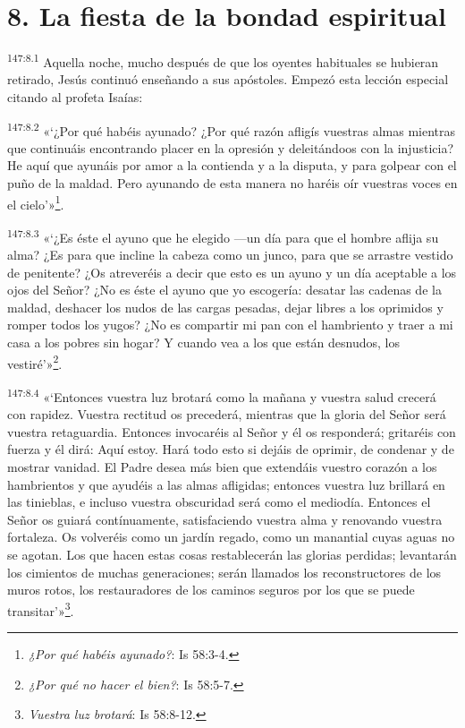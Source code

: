\section*{8. La fiesta de la bondad espiritual}
\par
\textsuperscript{147:8.1} Aquella noche, mucho después de que los oyentes habituales se hubieran retirado, Jesús continuó enseñando a sus apóstoles. Empezó esta lección especial citando al profeta Isaías:

\par
\textsuperscript{147:8.2} «`¿Por qué habéis ayunado? ¿Por qué razón afligís vuestras almas mientras que continuáis encontrando placer en la opresión y deleitándoos con la injusticia? He aquí que ayunáis por amor a la contienda y a la disputa, y para golpear con el puño de la maldad. Pero ayunando de esta manera no haréis oír vuestras voces en el cielo'»\footnote{\textit{¿Por qué habéis ayunado?}: Is 58:3-4.}.

\par
\textsuperscript{147:8.3} «`¿Es éste el ayuno que he elegido ---un día para que el hombre aflija su alma? ¿Es para que incline la cabeza como un junco, para que se arrastre vestido de penitente? ¿Os atreveréis a decir que esto es un ayuno y un día aceptable a los ojos del Señor? ¿No es éste el ayuno que yo escogería: desatar las cadenas de la maldad, deshacer los nudos de las cargas pesadas, dejar libres a los oprimidos y romper todos los yugos? ¿No es compartir mi pan con el hambriento y traer a mi casa a los pobres sin hogar? Y cuando vea a los que están desnudos, los vestiré'»\footnote{\textit{¿Por qué no hacer el bien?}: Is 58:5-7.}.

\par
\textsuperscript{147:8.4} «`Entonces vuestra luz brotará como la mañana y vuestra salud crecerá con rapidez. Vuestra rectitud os precederá, mientras que la gloria del Señor será vuestra retaguardia. Entonces invocaréis al Señor y él os responderá; gritaréis con fuerza y él dirá: Aquí estoy. Hará todo esto si dejáis de oprimir, de condenar y de mostrar vanidad. El Padre desea más bien que extendáis vuestro corazón a los hambrientos y que ayudéis a las almas afligidas; entonces vuestra luz brillará en las tinieblas, e incluso vuestra obscuridad será como el mediodía. Entonces el Señor os guiará contínuamente, satisfaciendo vuestra alma y renovando vuestra fortaleza. Os volveréis como un jardín regado, como un manantial cuyas aguas no se agotan. Los que hacen estas cosas restablecerán las glorias perdidas; levantarán los cimientos de muchas generaciones; serán llamados los reconstructores de los muros rotos, los restauradores de los caminos seguros por los que se puede transitar'»\footnote{\textit{Vuestra luz brotará}: Is 58:8-12.}.

